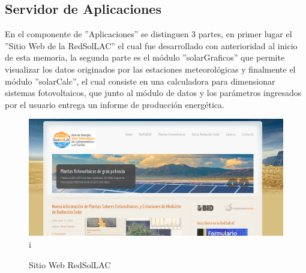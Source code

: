 \subsection{Servidor de Aplicaciones}
En el componente de ''Aplicaciones'' se distinguen 3 partes, en primer lugar el ''Sitio Web de la RedSolLAC'' el cual fue desarrollado con anterioridad al inicio de esta memoria, la segunda parte es el módulo ''solarGraficos'' que permite visualizar los datos originados por las estaciones meteorológicas y finalmente el módulo ''solarCalc'', el cual consiste en una calculadora para dimensionar sistemas fotovoltaicos, que junto al módulo de datos y los parámetros ingresados por el usuario entrega un informe de producción energética.

\begin{figure}[h!]
        \centering
        \includegraphics[scale=0.4]{images/webRedSolLAC}i
        \caption{Sitio Web RedSolLAC}
        \label{webRed}
\end{figure}

